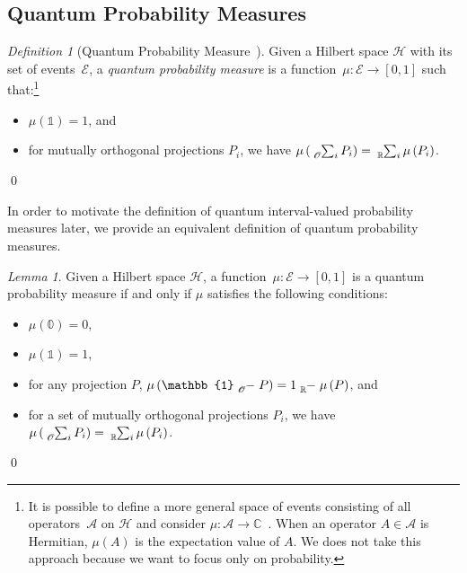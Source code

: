 \documentclass{article}
\theoremstyle{remark}
\newtheorem{definition}{Definition}
\newtheorem{lemma}{Lemma}
\newcommand{\events}{\ensuremath{\mathcal{E}}}
\newcommand{\Hilb}{\mathcal{H}}
\def\C{{\mathbb{C}}}
\begin{document}
\subsection{Quantum Probability Measures}

\begin{definition}[Quantum Probability
Measure~\cite{10.2307/2308516,gleason1957,Redhead1987-REDINA,Maassen2010}]\label{def:QuantumProbabilitySpace}
Given a Hilbert space $\Hilb$ with its set of events~$\events$, a
\emph{quantum probability measure} is a function~$\mu : \events \rightarrow
[0,1]$ such that:\footnote {It is possible to define a more general space of events consisting of
    all operators~$\mathcal{A}$ on $\Hilb$ and consider
    $\mu:\mathcal{A}\rightarrow\C$~\cite{Maassen2010,Swart2013}.  When
    an operator $A\in\mathcal{A}$ is Hermitian, $\mu\left(A\right)$ is
    the expectation value of $A$. We does not take this approach
    because we want to focus only on probability. }
\begin{itemize}
\item $\mu(\mathbb{1})=1$, and 
\item for mutually orthogonal projections $P_{i}$, we have 
$\mu\left(\tensor*[_{\mathscr{O}}]{\sum}{_{i}}P_{i}\right)=\tensor*[_{\mathbb{R}}]{\sum}{_{i}}\mu\left(P_{i}\right)$.
\end{itemize}
\qed\end{definition}

In order to motivate the definition of quantum interval-valued probability
measures later, we provide an equivalent definition of quantum probability
measures.

\begin{lemma}\label{lem:quantumProbabilityMeasure}Given a Hilbert
space $\Hilb$, a function~$\mu:\events\rightarrow[0,1]$ is a quantum probability
measure if and only if $\mu$ satisfies the following conditions:
\begin{itemize}
\item $\mu(\mathbb{0})=0$, 
\item $\mu(\mathbb{1})=1$, 
\item for any projection $P$,
$\mu\left(\mathbb{1}\tensor*[_{\mathscr{O}}]{-}{}P\right)=1\tensor*[_{\mathbb{R}}]{-}{}\mu\left(P\right)$, and 
\item for a set of mutually orthogonal projections $P_{i}$, we have
$\mu\left(\tensor*[_{\mathscr{O}}]{\sum}{_{i}}P_{i}\right)=\tensor*[_{\mathbb{R}}]{\sum}{_{i}}\mu\left(P_{i}\right)$.
\end{itemize}
\qed\end{lemma}
\end{document}

